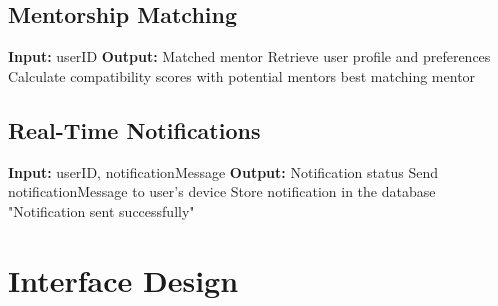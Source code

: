 \subsection{Mentorship Matching}
\begin{algorithmic}[1]
\State \textbf{Input:} userID
\State \textbf{Output:} Matched mentor
\State
\State Retrieve user profile and preferences
\State Calculate compatibility scores with potential mentors
\State \Return best matching mentor
\end{algorithmic}

\subsection{Real-Time Notifications}
\begin{algorithmic}[1]
\State \textbf{Input:} userID, notificationMessage
\State \textbf{Output:} Notification status
\State
\State Send notificationMessage to user's device
\State Store notification in the database
\State \Return "Notification sent successfully"
\end{algorithmic}

\section{Interface Design}
\label{sec:interface_design}

